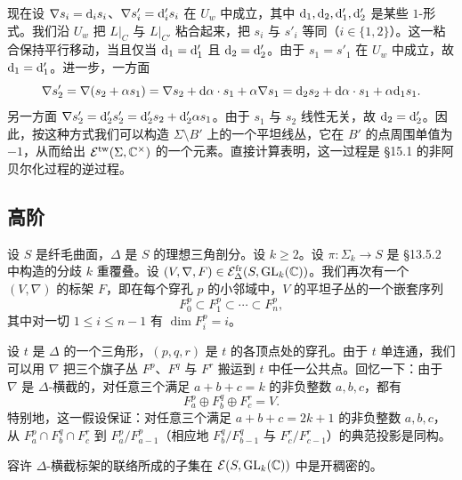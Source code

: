 现在设 $\nabla s_i=\mathrm{d}_is_i$、$\nabla s'_i=\mathrm{d}'_is_i$ 在 $U_w$ 中成立，其中 $\mathrm{d}_1,\mathrm{d}_2,\mathrm{d}'_1,\mathrm{d}'_2$ 是某些 $1$-形式。我们沿 $U_w$ 把 $L|_C$ 与 $L|_{C'}$ 粘合起来，把 $s_i$ 与 $s'_i$ 等同（$i\in\{1,2\}$）。这一粘合保持平行移动，当且仅当 $\mathrm{d}_1=\mathrm{d}'_1$ 且 $\mathrm{d}_2=\mathrm{d}'_2$。由于 $s_1=s'_1$ 在 $U_w$ 中成立，故 $\mathrm{d}_1=\mathrm{d}'_1$。进一步，一方面
\[
\nabla s'_2=\nabla(s_2+\alpha s_1)=\nabla s_2+\mathrm{d}\alpha\cdot s_1+\alpha\nabla s_1=\mathrm{d}_2s_2+\mathrm{d}\alpha\cdot s_1+\alpha \mathrm{d}_1s_1 .
\]
另一方面 $\nabla s'_2=\mathrm{d}'_2s'_2=\mathrm{d}'_2s_2+\mathrm{d}'_2\alpha s_1$。由于 $s_1$ 与 $s_2$ 线性无关，故 $\mathrm{d}_2=\mathrm{d}'_2$。因此，按这种方式我们可以构造 $\Sigma\setminus B'$ 上的一个平坦线丛，它在 $B'$ 的点周围单值为 $-1$，从而给出 $\mathcal{E}^{\mathrm{tw}}(\Sigma,\mathbb{C}^\times)$ 的一个元素。直接计算表明，这一过程是 §15.1 的非阿贝尔化过程的逆过程。

\subsection{高阶}

设 $S$ 是纤毛曲面，$\Delta$ 是 $S$ 的理想三角剖分。设 $k\ge2$。设 $\pi\colon\Sigma_k\to S$ 是 §13.5.2 中构造的分歧 $k$ 重覆叠。设 $(V,\nabla,F)\in\mathcal{E}^{\mathrm{fr}}_\Delta(S,\operatorname{GL}_k(\mathbb{C}))$。我们再次有一个 $(V,\nabla)$ 的标架 $F$，即在每个穿孔 $p$ 的小邻域中，$V$ 的平坦子丛的一个嵌套序列
\[
F^p_0\subset F^p_1\subset\cdots\subset F^p_n ,
\]
其中对一切 $1\le i\le n-1$ 有 $\dim F^p_i=i$。

设 $t$ 是 $\Delta$ 的一个三角形，$(p,q,r)$ 是 $t$ 的各顶点处的穿孔。由于 $t$ 单连通，我们可以用 $\nabla$ 把三个旗子丛 $F^p$、$F^q$ 与 $F^r$ 搬运到 $t$ 中任一公共点。回忆一下：由于 $\nabla$ 是 $\Delta$-横截的，对任意三个满足 $a+b+c=k$ 的非负整数 $a,b,c$，都有
\[
F^p_a\oplus F^q_b\oplus F^r_c=V .
\]
特别地，这一假设保证：对任意三个满足 $a+b+c=2k+1$ 的非负整数 $a,b,c$，从 $F^p_a\cap F^q_b\cap F^r_c$ 到 $F^p_a/F^p_{a-1}$（相应地 $F^q_b/F^q_{b-1}$ 与 $F^r_c/F^r_{c-1}$）的典范投影是同构。

\begin{remark}[15.2]
容许 $\Delta$-横截标架的联络所成的子集在 $\mathcal{E}(S,\operatorname{GL}_k(\mathbb{C}))$ 中是开稠密的。
\end{remark}

